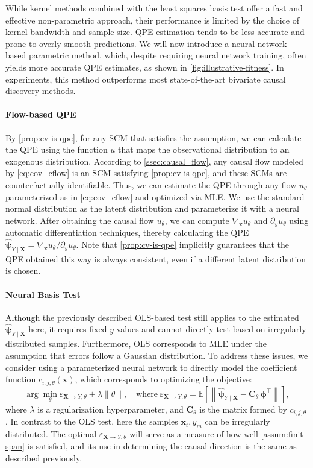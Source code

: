 \documentclass{article}
\theoremstyle{plain}
\theoremstyle{definition}
\theoremstyle{remark}
\newcommand{\rebuttalmodify}[1]{\todo[size=\scriptsize, color=cyan!30]{#1}}%
\begin{document}
While kernel methods combined with the least squares basis test offer a fast and effective non-parametric approach, their performance is limited by the choice of kernel bandwidth and sample size. QPE estimation tends to be less accurate and prone to overly smooth predictions. We will now introduce a neural network-based parametric method, which, despite requiring neural network training, often yields more accurate QPE estimates, as shown in \cref{fig:illustrative-fitness}. In experiments, this method outperforms most state-of-the-art bivariate causal discovery methods.

\paragraph{Flow-based QPE} By \cref{prop:cv-is-qpe}, for any SCM that satisfies the assumption, we can calculate the QPE using the function $u$ that maps the observational distribution to an exogenous distribution. According to \cref{ssec:causal_flow}, any causal flow modeled by \cref{eq:cov_cflow} is an SCM satisfying \cref{prop:cv-is-qpe}, and these SCMs are counterfactually identifiable. Thus, we can estimate the QPE through any flow $u_\theta$ parameterized as in \cref{eq:cov_cflow} and optimized via MLE. We use the standard normal distribution as the latent distribution and parameterize it with a neural network. After obtaining the causal flow $u_\theta$, we can compute $\nabla_{\bm{x}}u_\theta$ and $\partial_yu_\theta$ using automatic differentiation techniques, thereby calculating the QPE $\hat{\bm{\psi}}_{Y\mid\bm{X}}=\nabla_{\bm{x}}u_\theta/\partial_yu_\theta$. Note that \cref{prop:cv-is-qpe} implicitly guarantees that the QPE obtained this way is always consistent, even if a different latent distribution is chosen.

\paragraph{Neural Basis Test} Although the previously described OLS-based test still applies to the estimated $\hat{\bm{\psi}}_{Y\mid\bm{X}}$ here, it requires fixed $y$ values and cannot directly test based on irregularly distributed samples. Furthermore, OLS corresponds to MLE under the assumption that \rebuttalmodify{Modified for ``W1w7:W5''} errors follow a Gaussian distribution. To address these issues, we consider using a parameterized neural network to directly model the coefficient function $c_{i,j,\theta}(\bm{x})$, which corresponds to optimizing the objective:
$$\arg\min_\theta\varepsilon_{\bm{X}\to Y,\theta}+\lambda\|\theta\|,\quad\text{where}\ \varepsilon_{\bm{X}\to Y,\theta}=\mathbb{E}\left[\left\|\hat{\bm{\psi}}_{Y\mid\bm{X}}-\bm{C}_\theta\,\bm{\phi}^\intercal\right\|\right],$$
where $\lambda$ is a regularization hyperparameter, and $\bm{C}_\theta$ is the matrix formed by $c_{i,j,\theta}$. In contrast to the OLS test, here the samples $\bm{x}_t,y_m$ can be irregularly \rebuttalmodify{Modified for ``W1w7:W5''} distributed. The optimal $\varepsilon_{\bm{X}\to Y,\theta}$ will serve as a measure of how well \cref{assum:finit-span} is satisfied, and its use in determining the causal direction is the same as described previously.
\end{document}
